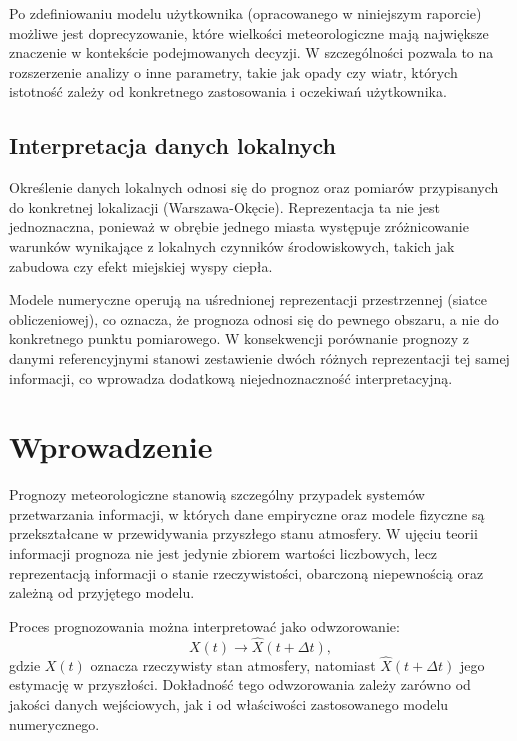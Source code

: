 \documentclass[a4paper,12pt]{article}
\begin{document}
Po zdefiniowaniu modelu użytkownika (opracowanego w niniejszym raporcie) możliwe jest doprecyzowanie, które wielkości meteorologiczne mają największe znaczenie w kontekście podejmowanych decyzji. W szczególności pozwala to na rozszerzenie analizy o inne parametry, takie jak opady czy wiatr, których istotność zależy od konkretnego zastosowania i oczekiwań użytkownika.



\subsection{Interpretacja danych lokalnych}
 
Określenie danych lokalnych odnosi się do prognoz oraz pomiarów
przypisanych do konkretnej lokalizacji (Warszawa-Okęcie). Reprezentacja ta nie jest jednoznaczna, ponieważ w obrębie jednego miasta występuje zróżnicowanie warunków wynikające z lokalnych czynników środowiskowych, takich jak zabudowa czy efekt miejskiej wyspy ciepła.

Modele numeryczne operują na uśrednionej reprezentacji przestrzennej (siatce obliczeniowej), co oznacza, że prognoza odnosi się do pewnego obszaru, a nie do konkretnego punktu pomiarowego. W konsekwencji porównanie prognozy z danymi referencyjnymi stanowi zestawienie dwóch różnych reprezentacji tej samej informacji, co wprowadza dodatkową niejednoznaczność interpretacyjną.

\newpage

\section{Wprowadzenie}

Prognozy meteorologiczne stanowią szczególny przypadek systemów przetwarzania informacji, w których dane empiryczne oraz modele fizyczne są przekształcane w przewidywania przyszłego stanu atmosfery. W ujęciu teorii informacji prognoza nie jest jedynie zbiorem wartości liczbowych, lecz reprezentacją informacji o stanie rzeczywistości, obarczoną niepewnością oraz zależną od przyjętego modelu.

Proces prognozowania można interpretować jako odwzorowanie:
\[
X(t) \rightarrow \hat{X}(t+\Delta t),
\]
gdzie $X(t)$ oznacza rzeczywisty stan atmosfery, natomiast $\hat{X}(t+\Delta t)$ jego estymację w przyszłości. Dokładność tego odwzorowania zależy zarówno od jakości danych wejściowych, jak i od właściwości zastosowanego modelu numerycznego.
\end{document}
